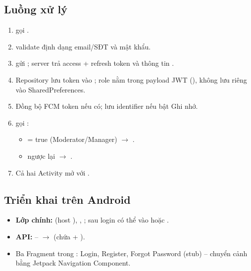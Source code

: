 \subsection{Luồng xử lý}
\begin{enumerate}
    \item {} gọi .
    \item {} validate định dạng email/SĐT và mật khẩu.
    \item {} gửi ; server trả
    access + refresh token và thông tin .
    \item Repository lưu token vào ; role nằm trong
    payload JWT (), không lưu riêng vào SharedPreferences.
    \item Đồng bộ FCM token nếu có; lưu identifier nếu bật Ghi nhớ.
    \item {} gọi :
    \begin{itemize}
        \item {} = true (Moderator/Manager)
        $\rightarrow$ .
        \item ngược lại $\rightarrow$ .
    \end{itemize}
    \item Cả hai Activity mở với .
\end{enumerate}

\subsection{Triển khai trên Android}
\begin{itemize}
    \item \textbf{Lớp chính:}  (host ),
    , ; sau login có thể vào
     hoặc .
    \item \textbf{API:}  --
     $\rightarrow$  (chứa
     + ).
    \item Ba Fragment trong : Login, Register, Forgot
    Password (stub) -- chuyển cảnh bằng Jetpack Navigation Component.
\end{itemize}

